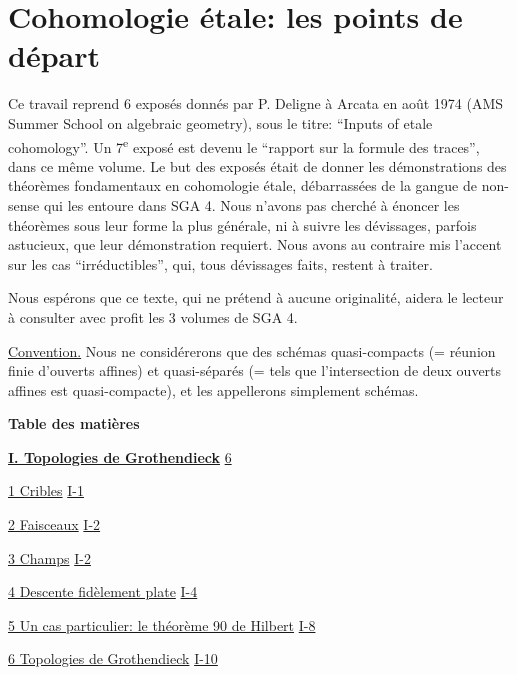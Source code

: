 
\chapter{Cohomologie étale: les points de départ}\label{I}

Ce travail reprend 6 exposés donnés par P. Deligne à Arcata en août 1974
(AMS Summer School on algebraic geometry), sous le titre: ``Inputs of etale
cohomology''. Un 7\textsuperscript{e} exposé est devenu le ``rapport sur la formule des traces'',
dans ce même volume. Le but des exposés était de donner les démonstrations des
théorèmes fondamentaux en cohomologie étale, débarrassées de la gangue de
non-sense qui les entoure dans SGA 4. Nous n'avons pas cherché à énoncer les
théorèmes sous leur forme la plus générale, ni à suivre les dévissages, parfois
astucieux, que leur démonstration requiert. Nous avons au contraire mis l'accent
sur les cas ``irréductibles'', qui, tous dévissages faits, restent à traiter.

Nous espérons que ce texte, qui ne prétend à aucune originalité, aidera le
lecteur à consulter avec profit les 3 volumes de SGA 4.

\medskip
\noindent\underline{Convention.} Nous ne considérerons que des schémas
quasi-compacts (= réunion finie d'ouverts affines) et quasi-séparés (= tels que
l'intersection de deux ouverts affines est quasi-compacte), et les appellerons
simplement schémas.

\newpage

\begingroup
\small
\setlength{\parindent}{0pt}
\begin{center}
  \textbf{Table des matières}
\end{center}

\hyperref[I:1]{\textbf{I. Topologies de Grothendieck}}\dotfill
  \hyperref[I:1]{6}\par
\hspace*{1.5em}\hyperref[I:1-1]{1 Cribles}\dotfill
  \hyperref[I:1-1]{I-1}\par
\hspace*{1.5em}\hyperref[I:1-2]{2 Faisceaux}\dotfill
  \hyperref[I:1-2]{I-2}\par
\hspace*{1.5em}\hyperref[I:1-3]{3 Champs}\dotfill
  \hyperref[I:1-3]{I-2}\par
\hspace*{1.5em}\hyperref[I:1-4]{4 Descente fidèlement plate}\dotfill
  \hyperref[I:1-4]{I-4}\par
\hspace*{1.5em}\hyperref[I:1-5]{5 Un cas particulier: le théorème 90 de Hilbert}\dotfill
  \hyperref[I:1-5]{I-8}\par
\hspace*{1.5em}\hyperref[I:1-6]{6 Topologies de Grothendieck}\dotfill
  \hyperref[I:1-6]{I-10}\par

